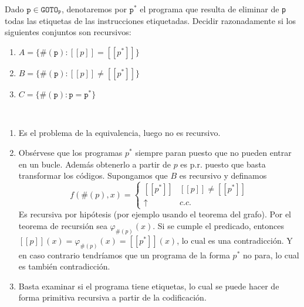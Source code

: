 \documentclass[twoside]{article}
\begin{document}
\begin{ejercicio}{12}
Dado $\texttt{p} \in \texttt{GOTO}_\texttt{P}$, denotaremos por $\texttt{p}^*$ el programa que resulta de eliminar de \texttt{p} todas
las etiquetas de las instrucciones etiquetadas. Decidir razonadamente si los siguientes conjuntos
son recursivos:
\begin{enumerate}
\item $A = \{\#(\texttt{p}) : [\![p]\!] = [\![p^*]\!]\}$
\item  $B = \{\#(\texttt{p}) : [\![p]\!] \neq [\![p^*]\!]\}$
\item $C = \{\#(\texttt{p}) : \texttt{p} = \texttt{p}^*\}$
\end{enumerate}
\end{ejercicio}
\begin{solucion}\
\begin{enumerate}
\item Es el problema de la equivalencia, luego no es recursivo. 
\item Obsérvese que los programas $p^*$ siempre paran puesto que no pueden entrar en un bucle. Además obtenerlo a partir de $p$ es p.r. puesto que basta transformar los códigos. Supongamos que $B$ es recursivo y definamos
\[
f(\#(p),x)=\begin{cases}
[\![p^*]\!] & [\![p]\!] \neq [\![p^*]\!]\\
\uparrow & c.c.
\end{cases}
\]
Es recursiva por hipótesis (por ejemplo usando el teorema del grafo). Por el teorema de recursión sea $\varphi_{\#(p)}(x)$. Si se cumple el predicado, entonces $[\![p]\!](x)=\varphi_{\#(p)}(x)=[\![p^*]\!](x)$, lo cual es una contradicción. Y en caso contrario tendríamos que un programa de la forma $p^*$ no para, lo cual es también contradicción.
\item Basta examinar si el programa tiene etiquetas, lo cual se puede hacer de forma primitiva recursiva a partir de la codificación.
\end{enumerate}
\end{solucion}

\newpage
\end{document}
